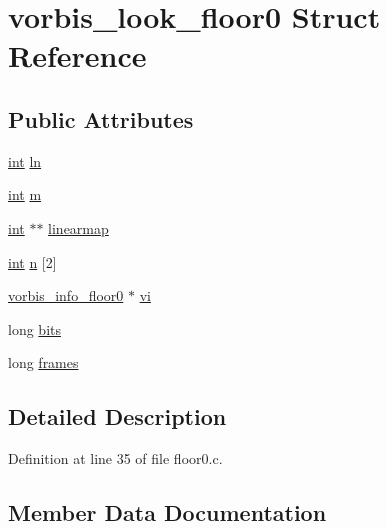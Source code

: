 \hypertarget{structvorbis__look__floor0}{}\section{vorbis\+\_\+look\+\_\+floor0 Struct Reference}
\label{structvorbis__look__floor0}
\subsection*{Public Attributes}
\begin{DoxyCompactItemize}
\item 
\hyperlink{xmltok_8h_a5a0d4a5641ce434f1d23533f2b2e6653}{int} \hyperlink{structvorbis__look__floor0_aee9a6a8b6dccc47a80928209322cf83d}{ln}
\item 
\hyperlink{xmltok_8h_a5a0d4a5641ce434f1d23533f2b2e6653}{int} \hyperlink{structvorbis__look__floor0_a2c97e5e8bd8f4e1e8ad0e75e76f614a2}{m}
\item 
\hyperlink{xmltok_8h_a5a0d4a5641ce434f1d23533f2b2e6653}{int} $\ast$$\ast$ \hyperlink{structvorbis__look__floor0_ad94c008fd959bf0111e3371a78385bbb}{linearmap}
\item 
\hyperlink{xmltok_8h_a5a0d4a5641ce434f1d23533f2b2e6653}{int} \hyperlink{structvorbis__look__floor0_ad90f6b0d5838dd0cb8a17fa976611c94}{n} \mbox{[}2\mbox{]}
\item 
\hyperlink{structvorbis__info__floor0}{vorbis\+\_\+info\+\_\+floor0} $\ast$ \hyperlink{structvorbis__look__floor0_ab48f65e22b5580857a356ea5bc95a971}{vi}
\item 
long \hyperlink{structvorbis__look__floor0_a7467d9fbcab1ebbc0fc56ecd1f4efa6b}{bits}
\item 
long \hyperlink{structvorbis__look__floor0_a14e16b6b502677e8ec256f54838eb932}{frames}
\end{DoxyCompactItemize}


\subsection{Detailed Description}


Definition at line 35 of file floor0.\+c.



\subsection{Member Data Documentation}
